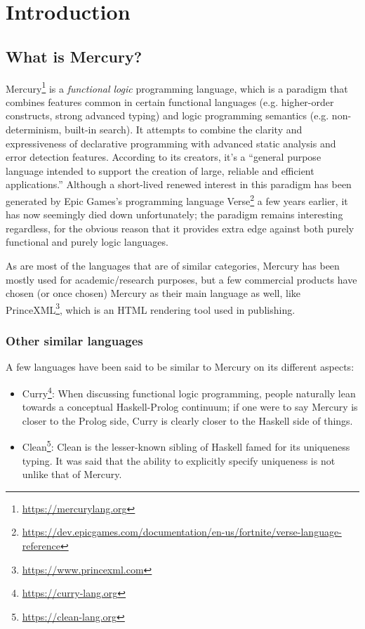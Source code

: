\chapter{Introduction}


\section{What is Mercury?}

Mercury\footnote{\url{https://mercurylang.org}} is a \textit{functional logic} programming language, which is a paradigm that combines features common in certain functional languages (e.g. higher-order constructs, strong advanced typing) and logic programming semantics (e.g. non-determinism, built-in search). It attempts to combine the clarity and expressiveness of declarative programming with advanced static analysis and error detection features. According to its creators, it's a ``general purpose language intended to support the creation of large, reliable and efficient applications.'' Although a short-lived renewed interest in this paradigm has been generated by Epic Games's programming language Verse\footnote{\url{https://dev.epicgames.com/documentation/en-us/fortnite/verse-language-reference}} a few years earlier, it has now seemingly died down unfortunately; the paradigm remains interesting regardless, for the obvious reason that it provides extra edge against both purely functional and purely logic languages.

As are most of the languages that are of similar categories, Mercury has been mostly used for academic/research purposes, but a few commercial products have chosen (or once chosen) Mercury as their main language as well, like PrinceXML\footnote{\url{https://www.princexml.com}}, which is an HTML rendering tool used in publishing.

\subsection{Other similar languages}

A few languages have been said to be similar to Mercury on its different aspects:

\begin{itemize}
\item Curry\footnote{\url{https://curry-lang.org}}: When discussing functional logic programming, people naturally lean towards a conceptual Haskell-Prolog continuum; if one were to say Mercury is closer to the Prolog side, Curry is clearly closer to the Haskell side of things.
\item Clean\footnote{\url{https://clean-lang.org}}: Clean is the lesser-known sibling of Haskell famed for its uniqueness typing. It was said that the ability to explicitly specify uniqueness is not unlike that of Mercury.
\end{itemize}


